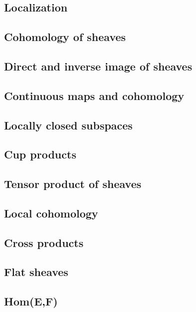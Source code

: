 \documentclass[5pt]{article}
\theoremstyle{definition}
\theoremstyle{remark}
\begin{document}
	\subsection{Localization}
	
	\subsection{Cohomology of sheaves}
	
	\subsection{Direct and inverse image of sheaves}
	
	\subsection{Continuous maps and cohomology}
	
	\subsection{Locally closed subspaces}
	
	\subsection{Cup products}
	
	\subsection{Tensor product of sheaves}
	
	\subsection{Local cohomology}
	
	\subsection{Cross products}
	
	\subsection{Flat sheaves}
	
	\subsection{Hom(E,F)}
	
	\newpage
	
\end{document}
